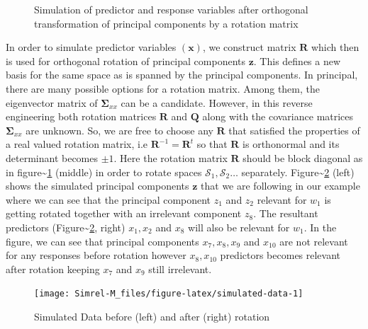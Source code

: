 \documentclass[12pt,A4paper,authoryear]{elsarticle} %
\theoremstyle{definition}
\theoremstyle{definition}
\theoremstyle{remark}
\begin{document}
\begin{figure}
\caption{Simulation of predictor and response variables after orthogonal transformation of principal components by a rotation matrix}\label{fig:cov-plot-print}
\end{figure}

In order to simulate predictor variables \((\mathbf{x})\), we construct
matrix \(\mathbf{R}\) which then is used for orthogonal rotation of
principal components \(\mathbf{z}\). This defines a new basis for the
same space as is spanned by the principal components. In principal,
there are many possible options for a rotation matrix. Among them, the
eigenvector matrix of \(\boldsymbol{\Sigma}_{xx}\) can be a candidate.
However, in this reverse engineering both rotation matrices
\(\mathbf{R}\) and \(\mathbf{Q}\) along with the covariance matrices
\(\boldsymbol{\Sigma}_{xx}\) are unknown. So, we are free to choose any
\(\mathbf{R}\) that satisfied the properties of a real valued rotation
matrix, i.e \(\mathbf{R}^{-1} = \mathbf{R}^t\) so that \(\mathbf{R}\) is
orthonormal and its determinant becomes \(\pm 1\). Here the rotation
matrix \(\mathbf{R}\) should be block diagonal as in
figure\textasciitilde{}\ref{fig:cov-plot-print} (middle) in order to
rotate spaces \(\mathcal{S}_1, \mathcal{S}_2 \ldots\) separately.
Figure\textasciitilde{}\ref{fig:simulated-data} (left) shows the
simulated principal components \(\mathbf{z}\) that we are following in
our example where we can see that the principal component \(z_{1}\) and
\(z_{2}\) relevant for \(w_1\) is getting rotated together with an
irrelevant component \(z_{8}\). The resultant predictors
(Figure\textasciitilde{}\ref{fig:simulated-data}, right)
\(x_{1}, x_{2}\) and \(x_{8}\) will also be relevant for \(w_1\). In the
figure, we can see that principal components \(x_{7}, x_{8}, x_{9}\) and
\(x_{10}\) are not relevant for any responses before rotation however
\(x_{8}, x_{10}\) predictors becomes relevant after rotation keeping
\(x_{7}\) and \(x_{9}\) still irrelevant.

\begin{figure}
\texttt{[image: Simrel-M\_files/figure-latex/simulated-data-1]} \caption{Simulated Data before (left) and after (right) rotation}\label{fig:simulated-data}
\end{figure}
\end{document}
